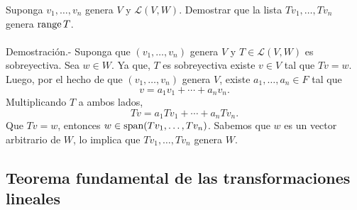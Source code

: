 \begin{lema}
Suponga $v_1,\ldots, v_n$ genera $V$ y $\mathcal{L}(V,W)$. Demostrar que la lista $Tv_1,\ldots,Tv_n$ genera $\operatorname{range} T$.\\\\
    Demostración.-\; Suponga que $(v_1,\ldots,v_n)$ genera $V$ y $T\in \mathcal{L}(V,W)$ es sobreyectiva. Sea $w\in W$. Ya que, $T$ es sobreyectiva existe $v\in V$ tal que $Tv=w$. Luego, por el hecho de que $(v_1,\ldots,v_n)$ genera $V$, existe $a_1,\ldots,a_n\in F$ tal que
    $$v=a_1v_1+\cdots+a_nv_n.$$
    Multiplicando $T$ a ambos lados,
    $$Tv=a_1Tv_1+\cdots+a_nTv_n.$$
    Que $Tv=w$, entonces $w\in \mathop{\mbox{\normalfont span}}\nolimits(Tv_1,\ldots,Tv_n)$. Sabemos que $w$ es un vector arbitrario de $W$, lo implica que $Tv_1,\ldots,Tv_n$ genera $W$.
\end{lema}


\subsection*{Teorema fundamental de las transformaciones lineales}

